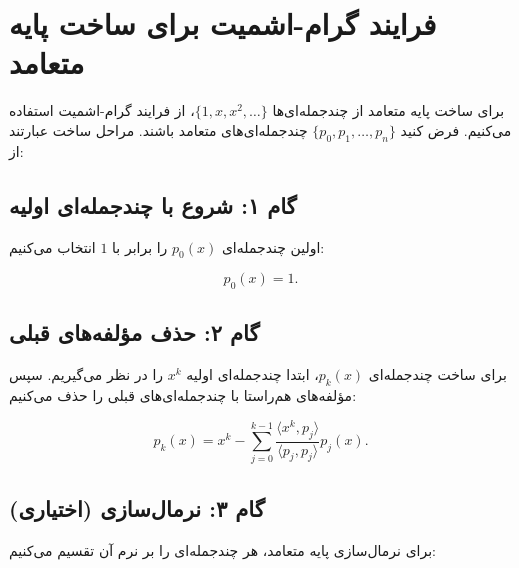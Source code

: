 \section{فرایند گرام-اشمیت برای ساخت پایه متعامد}

برای ساخت پایه متعامد از چندجمله‌ای‌ها \(\{1, x, x^2, \dots\}\)، از فرایند گرام-اشمیت استفاده می‌کنیم. فرض کنید \(\{p_0, p_1, \dots, p_n\}\) چندجمله‌ای‌های متعامد باشند. مراحل ساخت عبارتند از:

\subsection{گام ۱: شروع با چندجمله‌ای اولیه}

اولین چندجمله‌ای \(p_0(x)\) را برابر با \(1\) انتخاب می‌کنیم:

\[
p_0(x) = 1.
\]

\subsection{گام ۲: حذف مؤلفه‌های قبلی}

برای ساخت چندجمله‌ای \(p_k(x)\)، ابتدا چندجمله‌ای اولیه \(x^k\) را در نظر می‌گیریم. سپس مؤلفه‌های هم‌راستا با چندجمله‌ای‌های قبلی را حذف می‌کنیم:

\[
p_k(x) = x^k - \sum_{j=0}^{k-1} \frac{\langle x^k, p_j \rangle}{\langle p_j, p_j \rangle} p_j(x).
\]

\subsection{گام ۳: نرمال‌سازی (اختیاری)}

برای نرمال‌سازی پایه متعامد، هر چندجمله‌ای را بر نرم آن تقسیم می‌کنیم:

